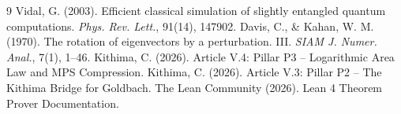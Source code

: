 \documentclass[11pt,a4paper]{article}
\begin{document}

\begin{thebibliography}{9}
  Vidal, G. (2003). Efficient classical simulation of slightly entangled quantum computations. \emph{Phys. Rev. Lett.}, 91(14), 147902.
  Davis, C., \& Kahan, W. M. (1970). The rotation of eigenvectors by a perturbation. III. \emph{SIAM J. Numer. Anal.}, 7(1), 1–46.
  Kithima, C. (2026). Article V.4: Pillar P3 – Logarithmic Area Law and MPS Compression.
  Kithima, C. (2026). Article V.3: Pillar P2 – The Kithima Bridge for Goldbach.
  The Lean Community (2026). Lean 4 Theorem Prover Documentation.
\end{thebibliography}
\end{document}
